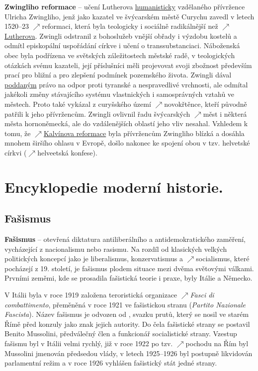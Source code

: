 \documentclass{article}
\begin{document}
  {\bf Zwingliho reformace} -- učení Lutherova \hyperref[sec:humanismus]{humanisticky} vzdělaného přívržence Ulricha Zwingliho, jenž jako kazatel ve švýcarském městě Curychu zavedl v letech 1520--23 $\nearrow$reformaci, která byla teologicky i sociálně radikálnější než $\nearrow$\hyperref[sec:lutherReformace]{Lutherova}. Zwingli odstranil z bohoslužeb vnější obřady i výzdobu kostelů a odmítl episkopální uspořádání církve i učení o transsubstanciaci. Náboženská obec byla podřízena ve světských záležitostech městské radě, v teologických otázkách svému kazateli, její příslušníci měli projevovat svoji zbožnost především prací pro bližní a pro zlepšení podmínek pozemského života. Zwingli dával \hyperref[sec:poddanstvi]{poddaným} právo na odpor proti tyranské a nespravedlivé vrchnosti, ale odmítal jakékoli změny stávajícího systému vlastnických i samosprávných vztahů ve městech. Proto také vykázal z curyšského území $\nearrow$novokřtěnce, kteří původně patřili k jeho přívržencům. Zwingli ovlivnil řadu švýcarských $\nearrow$měst i některá města hornoněmecká, ale do vzdálenějších oblastí jeho vliv nesahal. Vzhledem k tomu, že $\nearrow$\hyperref[sec:kalvinReformace]{Kalvínova reformace} byla přívržencům Zwingliho blízká a dosáhla mnohem širšího ohlasu v Evropě, došlo nakonec ke spojení obou v tzv. helvetské církvi ($\nearrow$helveetská konfese).

  \section*{Encyklopedie moderní historie.}
  \subsection*{Fašismus~\cite{Pecenka:}}
  \label{sec:fasismus}

  {\bf Fašismus} -- otevřená diktatura antiliberálního a antidemokratického zaměření, vycházející z nacionalismu nebo rasismu. Na rozdíl od klasických velkých politických koncepcí jako je liberalismus, konzervatismus a $\nearrow$socialismus, které pocházejí z 19. století, je fašismus plodem situace mezi dvěma světovými válkami. Prvními zeměmi, kde se prosadila fašistická teorie i praxe, byly Itálie a Německo.

  V Itálii byla v roce 1919 založena teroristická organizace $\nearrow${\it Fasci di combattimento}, přeměněná v roce 1921 ve fašistickou stranu ({\it Partito Nazionale Fascista}). Název fašismus je odvozen od , svazku prutů, který se nosil ve starém Římě před konzuly jako znak jejich autority. Do čela fašistické strany se postavil Benito Mussolini, předválečný člen a funkcionář socialistické strany. Vzestup fašismu byl v Itálii velmi rychlý, již v roce 1922 po tzv. $\nearrow$pochodu na Řím byl Mussolini jmenován předsedou vlády, v letech 1925--1926 byl postupně likvidován parlamentní režim a v roce 1926 vyhlášen fašistický stát jedné strany.
\end{document}
